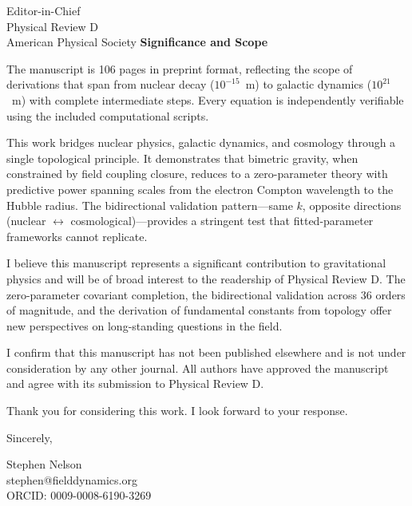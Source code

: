 \documentclass[11pt]{letter}
\begin{document}
\begin{letter}{%
Editor-in-Chief\\
Physical Review D\\
American Physical Society
}
\textbf{Significance and Scope}

The manuscript is 106 pages in preprint format, reflecting the scope of derivations that span from nuclear decay ($10^{-15}$~m) to galactic dynamics ($10^{21}$~m) with complete intermediate steps. Every equation is independently verifiable using the included computational scripts.

This work bridges nuclear physics, galactic dynamics, and cosmology through a single topological principle. It demonstrates that bimetric gravity, when constrained by field coupling closure, reduces to a zero-parameter theory with predictive power spanning scales from the electron Compton wavelength to the Hubble radius. The bidirectional validation pattern---same $k$, opposite directions (nuclear $\leftrightarrow$ cosmological)---provides a stringent test that fitted-parameter frameworks cannot replicate.

I believe this manuscript represents a significant contribution to gravitational physics and will be of broad interest to the readership of Physical Review D. The zero-parameter covariant completion, the bidirectional validation across 36 orders of magnitude, and the derivation of fundamental constants from topology offer new perspectives on long-standing questions in the field.

I confirm that this manuscript has not been published elsewhere and is not under consideration by any other journal. All authors have approved the manuscript and agree with its submission to Physical Review D.

Thank you for considering this work. I look forward to your response.

\noindent
Sincerely,

\vspace{2\medskipamount}

\noindent
Stephen Nelson\\
stephen@fielddynamics.org\\
ORCID: 0009-0008-6190-3269

\end{letter}
\end{document}
